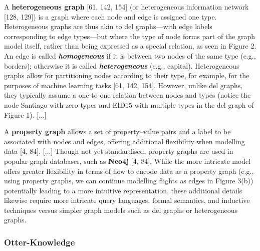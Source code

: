 \documentclass{article}
\begin{document}
\begin{itemize}
\begin{displayquote}
A \textbf{heterogeneous graph} [61, 142, 154] (or heterogeneous information network [128, 129]) is a graph where each node and edge is assigned one type. Heterogeneous graphs are thus akin to del graphs—with edge labels corresponding to edge types—but where the type of node forms part of the graph model itself, rather than being expressed as a special relation, as seen in Figure 2. An edge is called \textbf{\textit{homogeneous}} if it is between two nodes of the same type (e.g., borders); otherwise it is called \textbf{\textit{heterogeneous}} (e.g., capital). Heterogeneous graphs allow for partitioning nodes according to their type, for example, for the purposes of machine learning tasks [61, 142, 154]. However, unlike del graphs, they typically assume a one-to-one relation between nodes and types (notice the node Santiago with zero types and EID15 with multiple types in the del graph of Figure 1).
[...]

A \textbf{property graph} allows a set of property–value pairs and a label to be associated with nodes and edges, offering additional flexibility when modelling data [4, 84]. [...] Though not yet standardised, property graphs are used in popular graph databases, such as \textbf{Neo4j} [4, 84]. While the more intricate model offers greater flexibility in terms of how to encode data as a property graph (e.g., using property graphs, we can continue modelling flights as edges in Figure 3(b)) potentially leading to a more intuitive representation, these additional details likewise require more intricate query languages, formal semantics, and inductive techniques versus simpler graph models such as del graphs or heterogeneous graphs.
\end{displayquote}

\end{itemize}


\subsubsection{Otter-Knowledge}
\end{document}
